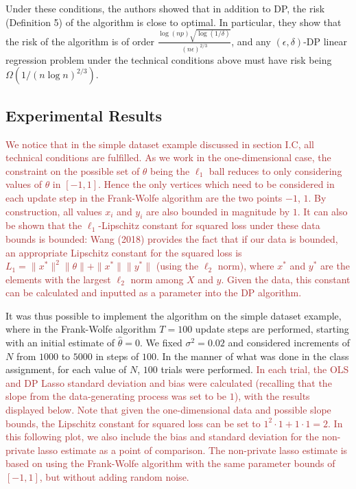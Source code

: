 \documentclass[11pt,conference]{IEEEtran}
\begin{document}
Under these conditions, the authors showed that in addition to DP, the risk (Definition 5) of the algorithm is close to optimal. In particular, they show that the risk of the algorithm is of order $\frac{\log(np)\sqrt{\log(1/\delta)}}{(n\epsilon)^{2/3}}$, and any $(\epsilon, \delta)$-DP linear regression problem under the technical conditions above must have risk being $\Omega(1/(n\log n)^{2/3})$. 


\subsection{Experimental Results}
\textcolor{brown}{We notice that in the simple dataset example discussed in section I.C, all technical conditions are fulfilled. As we work in the one-dimensional case, the constraint on the possible set of $\theta$ being the $\ell_1$ ball reduces to only considering values of $\theta$ in $[-1, 1]$. Hence the only vertices which need to be considered in each update step in the Frank-Wolfe algorithm are the two points $-1$, $1$. By construction, all values $x_i$ and $y_i$ are also bounded in magnitude by $1$. It can also be shown that the $\ell_1$-Lipschitz constant for squared loss under these data bounds is bounded: Wang (2018) provides the fact that if our data is bounded, an appropriate Lipschitz constant for the squared loss is $L_1=\|x^*\|^2\|\theta\|+\|x^*\|\|y^*\|$ (using the $\ell_2$ norm), where $x^*$ and $y^*$ are the elements with the largest $\ell_2$ norm among $X$ and $y$. Given the data, this constant can be calculated and inputted as a parameter into the DP algorithm.}

It was thus possible to implement the algorithm on the simple dataset example, where in the Frank-Wolfe algorithm $T=100$ update steps are performed, starting with an initial estimate of $\hat{\theta}=0$. We fixed $\sigma^2=0.02$ and considered increments of $N$ from $1000$ to $5000$ in steps of $100$. In the manner of what was done in the class assignment, for each value of $N$, $100$ trials were performed. \textcolor{brown}{In each trial, the OLS and DP Lasso standard deviation and bias were calculated (recalling that the slope from the data-generating process was set to be $1$), with the results displayed below. Note that given the one-dimensional data and possible slope bounds, the Lipschitz constant for squared loss can be set to $1^2\cdot 1 + 1\cdot 1=2$. In this following plot, we also include the bias and standard deviation for the non-private lasso estimate as a point of comparison. The non-private lasso estimate is based on using the Frank-Wolfe algorithm with the same parameter bounds of $[-1, 1]$, but without adding random noise.}
\end{document}
